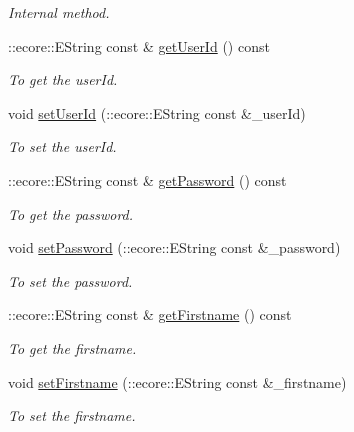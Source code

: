 \begin{DoxyCompactItemize}
\begin{DoxyCompactList}\small\item\em Internal method. \item\end{DoxyCompactList}\item 
::ecore::EString const \& \hyperlink{classUMS__Data_1_1User_a5190876e252aaa22748a7ffca8e3545b}{getUserId} () const 
\begin{DoxyCompactList}\small\item\em To get the userId. \item\end{DoxyCompactList}\item 
void \hyperlink{classUMS__Data_1_1User_a7f0dd36ba2346d0fe174bcb2d5292d96}{setUserId} (::ecore::EString const \&\_\-userId)
\begin{DoxyCompactList}\small\item\em To set the userId. \item\end{DoxyCompactList}\item 
::ecore::EString const \& \hyperlink{classUMS__Data_1_1User_ae08b8cab7724ece1f00f441a92badcc2}{getPassword} () const 
\begin{DoxyCompactList}\small\item\em To get the password. \item\end{DoxyCompactList}\item 
void \hyperlink{classUMS__Data_1_1User_aad9193f5f0c29e93b89a895469dd2714}{setPassword} (::ecore::EString const \&\_\-password)
\begin{DoxyCompactList}\small\item\em To set the password. \item\end{DoxyCompactList}\item 
::ecore::EString const \& \hyperlink{classUMS__Data_1_1User_a5a951df21aab30ef1ca9a78c322e3356}{getFirstname} () const 
\begin{DoxyCompactList}\small\item\em To get the firstname. \item\end{DoxyCompactList}\item 
void \hyperlink{classUMS__Data_1_1User_a000520c520bc553c6e28010b12dab0d1}{setFirstname} (::ecore::EString const \&\_\-firstname)
\begin{DoxyCompactList}\small\item\em To set the firstname. \item\end{DoxyCompactList}\item 

\end{DoxyCompactItemize}

